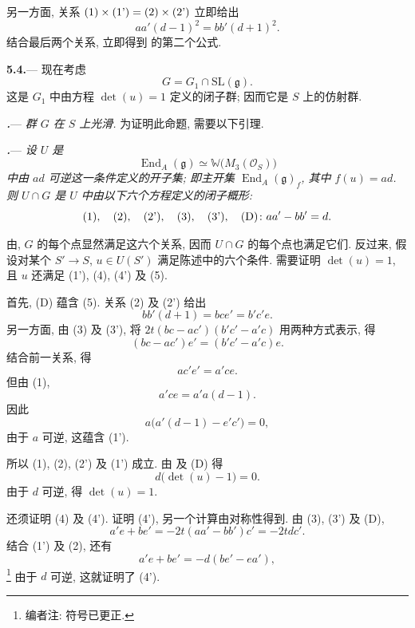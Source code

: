另一方面, 关系
\(\textup{(1)}\times\textup{(1')}=\textup{(2)}\times\textup{(2')}\)
立即给出
\[
  aa'(d-1)^2=bb'(d+1)^2.
\]
结合最后两个关系, 立即得到 的第二个公式.

\par\medskip\noindent
\textbf{5.4.}---
现在考虑
\[
  G=G_1\cap\mathrm{SL}(\mathfrak g).
\]
这是 \(G_1\) 中由方程 \(\det(u)=1\) 定义的闭子群; 因而它是 \(S\) 上的仿射群.

\par\medskip\noindent
{}\textbf{\textit{.}}---
\textit{群 \(G\) 在 \(S\) 上光滑.}
为证明此命题, 需要以下引理.

\par\medskip\noindent
\textbf{\textit{.}}---
\textit{设 \(U\) 是}
\[
  \operatorname{End}_A(\mathfrak g)
  \simeq
  \mathbb W\bigl(M_3(\mathcal O_S)\bigr)
\]
\textit{中由 \(ad\) 可逆这一条件定义的开子集; 即主开集 \(\operatorname{End}_A(\mathfrak g)_f\), 其中 \(f(u)=ad\). 则 \(U\cap G\) 是 \(U\) 中由以下六个方程定义的闭子概形:}
\[
  \textup{(1)},\quad
  \textup{(2)},\quad
  \textup{(2')},\quad
  \textup{(3)},\quad
  \textup{(3')},\quad
  \textup{(D)}\colon aa'-bb'=d.
\]

由, \(G\) 的每个点显然满足这六个关系, 因而 \(U\cap G\) 的每个点也满足它们. 反过来, 假设对某个 \(S'\to S\), \(u\in U(S')\) 满足陈述中的六个条件. 需要证明 \(\det(u)=1\), 且 \(u\) 还满足 \textup{(1')}, \textup{(4)}, \textup{(4')} 及 \textup{(5)}.

首先, \textup{(D)} 蕴含 \textup{(5)}. 关系 \textup{(2)} 及 \textup{(2')} 给出
\[
  bb'(d+1)=bce'=b'c'e.
\]
另一方面, 由 \textup{(3)} 及 \textup{(3')}, 将 \(2t(bc-ac')(b'c'-a'c)\) 用两种方式表示, 得
\[
  (bc-ac')e'=(b'c'-a'c)e.
\]
结合前一关系, 得
\[
  ac'e'=a'ce.
\]
但由 \textup{(1)},
\[
  a'ce=a'a(d-1).
\]
因此
\[
  a\bigl(a'(d-1)-e'c'\bigr)=0,
\]
由于 \(a\) 可逆, 这蕴含 \textup{(1')}.

所以 \textup{(1)}, \textup{(2)}, \textup{(2')} 及 \textup{(1')} 成立. 由 及 \textup{(D)} 得
\[
  d\bigl(\det(u)-1\bigr)=0.
\]
由于 \(d\) 可逆, 得 \(\det(u)=1\).

还须证明 \textup{(4)} 及 \textup{(4')}. 证明 \textup{(4')}, 另一个计算由对称性得到. 由 \textup{(3)}, \textup{(3')} 及 \textup{(D)},
\[
  a'e+be'=-2t(aa'-bb')c'=-2tdc'.
\]
结合 \textup{(1')} 及 \textup{(2)}, 还有
\[
  a'e+be'=-d(be'-ea'),
\]
\footnote{编者注: 符号已更正.}
由于 \(d\) 可逆, 这就证明了 \textup{(4')}.

